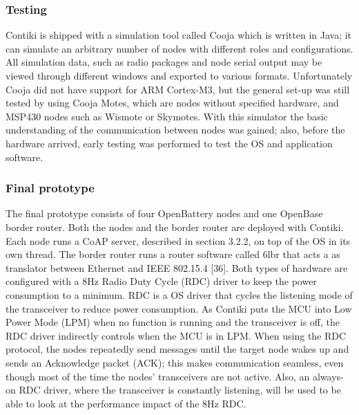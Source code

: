 \subsubsection{Testing}
Contiki is shipped with a simulation tool called Cooja which is written in Java;
	it can simulate an arbitrary number of nodes with different roles and configurations.
All simulation data,
	such as radio packages and node serial output may be viewed through different windows and exported to various formats.
Unfortunately Cooja did not have support for ARM Cortex-M3,
	but the general set-up was still tested by using Cooja Motes,
	which are nodes without specified hardware,
	and MSP430 nodes such as Wismote or Skymotes.
With this simulator the basic understanding of the communication between nodes was gained;
	also,
	before the hardware arrived,
	early testing was performed to test the OS and application software.

\subsubsection{Final prototype}
The final prototype consists of four OpenBattery nodes and one OpenBase border router.
Both the nodes and the border router are deployed with Contiki.
Each node runs a CoAP server,
	described in section 3.2.2,
	on top of the OS in its own thread.
The border router runs a router software called 6lbr that acts a as translator between Ethernet and IEEE 802.15.4 [36].
Both types of hardware are configured with a 8Hz Radio Duty Cycle (RDC) driver to keep the power consumption to a minimum.
RDC is a OS driver that cycles the listening mode of the transceiver to reduce power consumption.
As Contiki puts the MCU into Low Power Mode (LPM) when no function is running and the transceiver is off,
	the RDC driver indirectly controls when the MCU is in LPM.
When using the RDC protocol,
	the nodes repeatedly send messages until the target node wakes up and sends an Acknowledge packet (ACK);
	this makes communication seamless,
	even though most of the time the nodes’ transceivers are not active.
Also,
	an always-on RDC driver,
	where the transceiver is constantly listening,
	will be used to be able to look at the performance impact of the 8Hz RDC.





